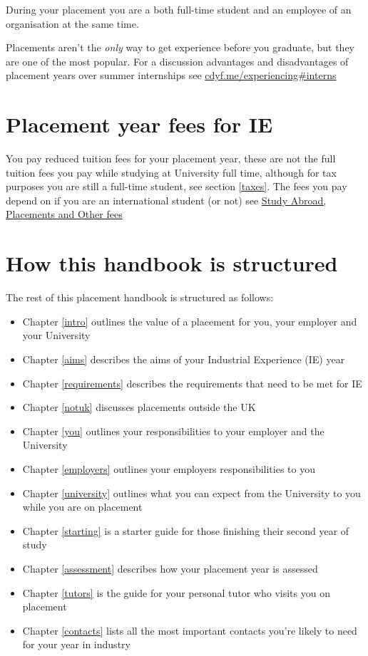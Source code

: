 \documentclass[
]{book}
\providecommand{\tightlist}{%
  \setlength{\itemsep}{0pt}\setlength{\parskip}{0pt}}
\begin{document}
During your placement you are a both full-time student and an employee of an organisation at the same time.

Placements aren't the \emph{only} way to get experience before you graduate, but they are one of the most popular. For a discussion advantages and disadvantages of placement years over summer internships see \href{https://www.cdyf.me/experiencing\#interns}{cdyf.me/experiencing\#interns} \citep{experiencing}

\section{Placement year fees for IE}\label{fees}

You pay reduced tuition fees for your placement year, these are not the full tuition fees you pay while studying at University full time, although for tax purposes you are still a full-time student, see section \ref{taxes}. The fees you pay depend on if you are an international student (or not) see \href{https://www.studentsupport.manchester.ac.uk/finances/tuition-fees/fee-amounts/other-fees/}{Study Abroad, Placements and Other fees} \citep{fees}

\section{How this handbook is structured}\label{guide}

The rest of this placement handbook is structured as follows:

\begin{itemize}
\tightlist
\item
  Chapter \ref{intro} outlines the value of a placement for you, your employer and your University
\item
  Chapter \ref{aims} describes the aims of your Industrial Experience (IE) year
\item
  Chapter \ref{requirements} describes the requirements that need to be met for IE
\item
  Chapter \ref{notuk} discusses placements outside the UK
\item
  Chapter \ref{you} outlines your responsibilities to your employer and the University
\item
  Chapter \ref{employers} outlines your employers responsibilities to you
\item
  Chapter \ref{university} outlines what you can expect from the University to you while you are on placement
\item
  Chapter \ref{starting} is a starter guide for those finishing their second year of study
\item
  Chapter \ref{assessment} describes how your placement year is assessed
\item
  Chapter \ref{tutors} is the guide for your personal tutor who visits you on placement
\item
  Chapter \ref{contacts} lists all the most important contacts you're likely to need for your year in industry
\end{itemize}
\end{document}
